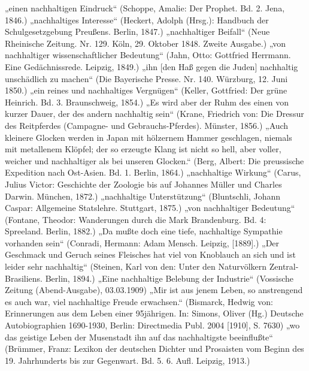 \documentclass[
    german,
    a4paper,%
    12pt,%
    oneside,%
    toc=bibliography,
    final,
]{scrartcl}
\begin{document}
\begin{exe}
\ex \label{ex-1846-1915-allg-first} „einen nachhaltigen Eindruck“ (Schoppe, Amalie: Der Prophet. Bd. 2. Jena, 1846.)
\ex „nachhaltiges Interesse“ (Heckert, Adolph (Hrsg.): Handbuch der Schulgesetzgebung Preußens. Berlin, 1847.)
\ex „nachhaltiger Beifall“ (Neue Rheinische Zeitung. Nr. 129. Köln, 29. Oktober 1848. Zweite Ausgabe.)
\ex „von nachhaltiger wissenschaftlicher Bedeutung“ (Jahn, Otto: Gottfried Herrmann. Eine Gedächnissrede. Leipzig, 1849.)
\ex „ihn [den Haß gegen die Juden] nachhaltig unschädlich zu machen“ (Die Bayerische Presse. Nr. 140. Würzburg, 12. Juni 1850.)
\ex „ein reines und nachhaltiges Vergnügen“ (Keller, Gottfried: Der grüne Heinrich. Bd. 3. Braunschweig, 1854.)
\ex „Es wird aber der Ruhm des einen von kurzer Dauer, der des andern nachhaltig sein“ (Krane, Friedrich von: Die Dressur des Reitpferdes (Campagne- und Gebrauchs-Pferdes). Münster, 1856.)
\ex „Auch kleinere Glocken werden in Japan mit hölzernem Hammer geschlagen, niemals mit metallenem Klöpfel; der so erzeugte Klang ist nicht so hell, aber voller, weicher und nachhaltiger als bei unseren Glocken.“ (Berg, Albert: Die preussische Expedition nach Ost-Asien. Bd. 1. Berlin, 1864.)
\ex „nachhaltige Wirkung“ (Carus, Julius Victor: Geschichte der Zoologie bis auf Johannes Müller und Charles Darwin. München, 1872.)
\ex „nachhaltige Unterstützung“ (Bluntschli, Johann Caspar: Allgemeine Statslehre. Stuttgart, 1875.)
\ex „von nachhaltiger Bedeutung“ (Fontane, Theodor: Wanderungen durch die Mark Brandenburg. Bd. 4: Spreeland. Berlin, 1882.)
\ex „Da mußte doch eine tiefe, nachhaltige Sympathie vorhanden sein“ (Conradi, Hermann: Adam Mensch. Leipzig, [1889].)
\ex „Der Geschmack und Geruch seines Fleisches hat viel von Knoblauch an sich und ist leider sehr nachhaltig“ (Steinen, Karl von den: Unter den Naturvölkern Zentral-Brasiliens. Berlin, 1894.)
\ex „Eine nachhaltige Belebung der Industrie“ (Vossische Zeitung (Abend-Ausgabe), 03.03.1909)
\ex „Mir ist aus jenem Leben, so anstrengend es auch war, viel nachhaltige Freude erwachsen.“ (Bismarck, Hedwig von: Erinnerungen aus dem Leben einer 95jährigen. In: Simons, Oliver (Hg.) Deutsche Autobiographien 1690-1930, Berlin: Directmedia Publ. 2004 [1910], S. 7630)
\ex \label{ex-1846-1915-allg-last} „wo das geistige Leben der Musenstadt ihn auf das nachhaltigste beeinflußte“ (Brümmer, Franz: Lexikon der deutschen Dichter und Prosaisten vom Beginn des 19. Jahrhunderts bis zur Gegenwart. Bd. 5. 6. Aufl. Leipzig, 1913.)
\end{exe}
\end{document}
